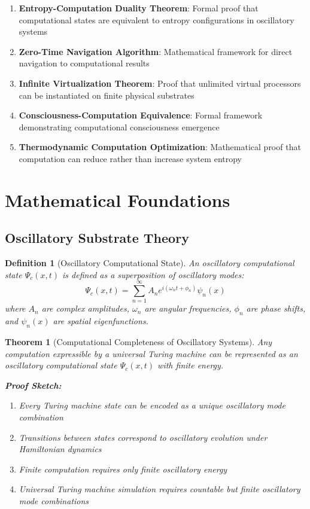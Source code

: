 \documentclass[12pt,a4paper]{article}
\newtheorem{theorem}{Theorem}
\newtheorem{definition}{Definition}
\begin{document}
\begin{enumerate}
\item \textbf{Entropy-Computation Duality Theorem}: Formal proof that computational states are equivalent to entropy configurations in oscillatory systems
\item \textbf{Zero-Time Navigation Algorithm}: Mathematical framework for direct navigation to computational results
\item \textbf{Infinite Virtualization Theorem}: Proof that unlimited virtual processors can be instantiated on finite physical substrates
\item \textbf{Consciousness-Computation Equivalence}: Formal framework demonstrating computational consciousness emergence
\item \textbf{Thermodynamic Computation Optimization}: Mathematical proof that computation can reduce rather than increase system entropy
\end{enumerate}

\section{Mathematical Foundations}

\subsection{Oscillatory Substrate Theory}

\begin{definition}[Oscillatory Computational State]
An oscillatory computational state $\Psi_c(x,t)$ is defined as a superposition of oscillatory modes:
\begin{equation}
\Psi_c(x,t) = \sum_{n=1}^{\infty} A_n e^{i(\omega_n t + \phi_n)} \psi_n(x)
\end{equation}
where $A_n$ are complex amplitudes, $\omega_n$ are angular frequencies, $\phi_n$ are phase shifts, and $\psi_n(x)$ are spatial eigenfunctions.
\end{definition}

\begin{theorem}[Computational Completeness of Oscillatory Systems]
Any computation expressible by a universal Turing machine can be represented as an oscillatory computational state $\Psi_c(x,t)$ with finite energy.

\textbf{Proof Sketch:} 
\begin{enumerate}
\item Every Turing machine state can be encoded as a unique oscillatory mode combination
\item Transitions between states correspond to oscillatory evolution under Hamiltonian dynamics
\item Finite computation requires only finite oscillatory energy
\item Universal Turing machine simulation requires countable but finite oscillatory mode combinations
\end{enumerate}
\end{theorem}
\end{document}
